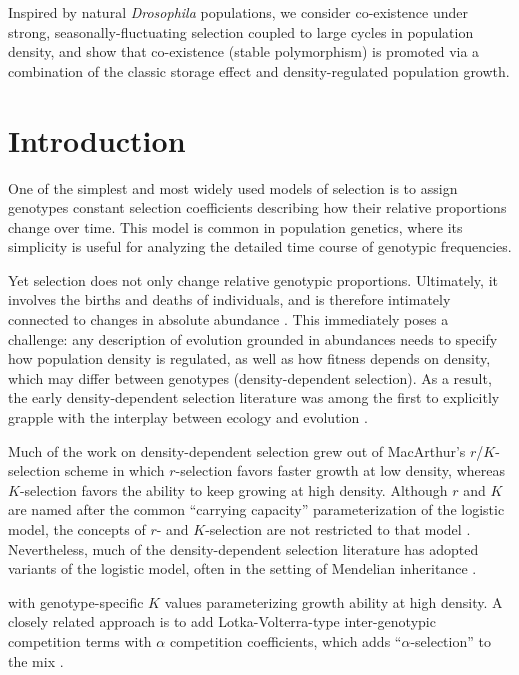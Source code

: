 \documentclass[11pt]{article}
\begin{document}
Inspired by natural \textit{Drosophila} populations, we consider co-existence under strong, seasonally-fluctuating selection coupled to large cycles in population density, and show that co-existence (stable polymorphism) is promoted via a combination of the classic storage effect and density-regulated population growth. 


\newpage{}


\section*{Introduction}

One of the simplest and most widely used models of selection is to assign genotypes constant selection coefficients describing how their relative proportions change over time. This model is common in population genetics, where its simplicity is useful for analyzing the detailed time course of genotypic frequencies. 

Yet selection does not only change relative genotypic proportions. Ultimately, it involves the births and deaths of individuals, and is therefore intimately connected to changes in absolute abundance \cite{evolution_demography_stuff}. This immediately poses a challenge: any description of evolution grounded in abundances needs to specify how population density is regulated, as well as how fitness depends on density, which may differ between genotypes (density-dependent selection). As a result, the early density-dependent selection literature was among the first to explicitly grapple with the interplay between ecology and evolution \citep{travis_2013}.

Much of the work on density-dependent selection grew out of MacArthur's $r$/$K$-selection scheme \citep{macarthur_1962,macarthur_1967} in which $r$-selection favors faster growth at low density, whereas $K$-selection favors the ability to keep growing at high density. Although $r$ and $K$ are named after the common ``carrying capacity'' parameterization of the logistic model, the concepts of $r$- and $K$-selection are not restricted to that model \citep{macarthur_1967}. Nevertheless, much of the density-dependent selection literature has adopted variants of the logistic model, often in the setting of Mendelian inheritance \cite{roughgarden etc}. 

with genotype-specific $K$ values parameterizing growth ability at high density. A closely related approach is to add Lotka-Volterra-type inter-genotypic competition terms with $\alpha$ competition coefficients, which adds ``$\alpha$-selection'' to the mix \citealt{gill_1974,case_1974,joshi_2001}.
\end{document}
